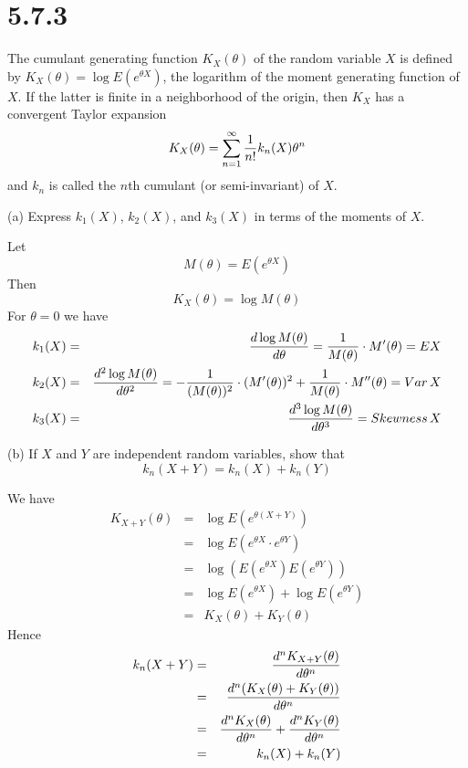 \section*{5.7.3}
The cumulant generating function $K_X(\theta)$ of the random variable
$X$ is defined by $K_X(\theta)=\log E(e^{\theta X})$, the logarithm
of the moment generating function of $X$.
If the latter is finite in a neighborhood of the origin, then $K_X$
has a convergent Taylor expansion
$$K_X(\theta)=\sum_{n=1}^\infty{1\over n!}k_n(X)\theta^n$$
and $k_n$ is called the $n$th cumulant (or semi-invariant) of $X$.

\bigskip
\noindent
(a) Express $k_1(X)$, $k_2(X)$, and $k_3(X)$ in terms of the
moments of $X$.

\bigskip
\noindent
Let
$$M(\theta)=E(e^{\theta X})$$
Then
$$K_X(\theta)=\log M(\theta)$$
For $\theta=0$ we have
\begin{eqnarray*}
k_1(X)&=&{d\log M(\theta)\over d\theta}
={1\over M(\theta)}\cdot M'(\theta)=EX\\
k_2(X)&=&{d^2\log M(\theta)\over d\theta^2}
=-{1\over(M(\theta))^2}\cdot(M'(\theta))^2+
{1\over M(\theta)}\cdot M''(\theta)=\mathop{Var}X\\
k_3(X)&=&{d^3\log M(\theta)\over d\theta^3}=\mathop{Skewness}X
\end{eqnarray*}

\bigskip
\noindent
(b) If $X$ and $Y$ are independent random variables, show that
$$k_n(X+Y)=k_n(X)+k_n(Y)$$

\bigskip
\noindent
We have
\begin{eqnarray*}
K_{X+Y}(\theta)&=&\log E(e^{\theta(X+Y)})\\
&=&\log E(e^{\theta X}\cdot e^{\theta Y})\\
&=&\log(E(e^{\theta X})E(e^{\theta Y}))\\
&=&\log E(e^{\theta X})+\log E(e^{\theta Y})\\
&=&K_X(\theta)+K_Y(\theta)
\end{eqnarray*}
Hence
\begin{eqnarray*}
k_n(X+Y)&=&{d^n K_{X+Y}(\theta)\over d\theta^n}\\
&=&{d^n(K_X(\theta)+K_Y(\theta))\over d\theta^n}\\
&=&
{d^nK_X(\theta)\over d\theta^n}
+{d^nK_Y(\theta)\over d\theta^n}\\
&=&k_n(X)+k_n(Y)
\end{eqnarray*}
